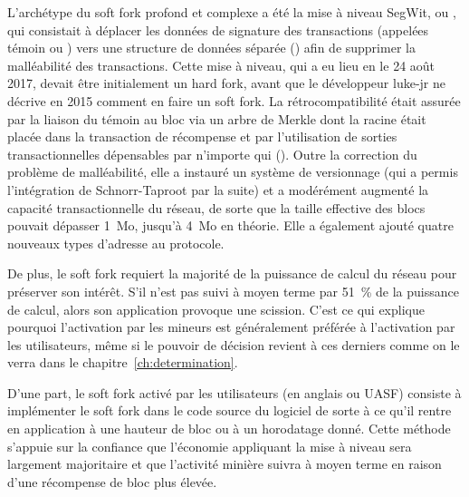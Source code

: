 L'archétype du soft fork profond et complexe a été la mise à niveau SegWit, ou , qui consistait à déplacer les données de signature des transactions (appelées témoin ou ) vers une structure de données séparée () afin de supprimer la malléabilité des transactions. Cette mise à niveau, qui a eu lieu en le 24 août 2017, devait être initialement un hard fork, avant que le développeur luke-jr ne décrive en 2015 comment en faire un soft fork. La rétrocompatibilité était assurée par la liaison du témoin au bloc via un arbre de Merkle dont la racine était placée dans la transaction de récompense et par l'utilisation de sorties transactionnelles dépensables par n'importe qui (). Outre la correction du problème de malléabilité, elle a instauré un système de versionnage (qui a permis l'intégration de Schnorr-Taproot par la suite) et a modérément augmenté la capacité transactionnelle du réseau, de sorte que la taille effective des blocs pouvait dépasser 1~Mo, jusqu'à 4~Mo en théorie. Elle a également ajouté quatre nouveaux types d'adresse au protocole.

De plus, le soft fork requiert la majorité de la puissance de calcul du réseau pour préserver son intérêt. S'il n'est pas suivi à moyen terme par 51~\% de la puissance de calcul, alors son application provoque une scission. C'est ce qui explique pourquoi l'activation par les mineurs est généralement préférée à l'activation par les utilisateurs, même si le pouvoir de décision revient à ces derniers comme on le verra dans le chapitre~\ref{ch:determination}.

D'une part, le soft fork activé par les utilisateurs (en anglais  ou UASF) consiste à implémenter le soft fork dans le code source du logiciel de sorte à ce qu'il rentre en application à une hauteur de bloc ou à un horodatage donné. Cette méthode s'appuie sur la confiance que l'économie appliquant la mise à niveau sera largement majoritaire et que l'activité minière suivra à moyen terme en raison d'une récompense de bloc plus élevée.

